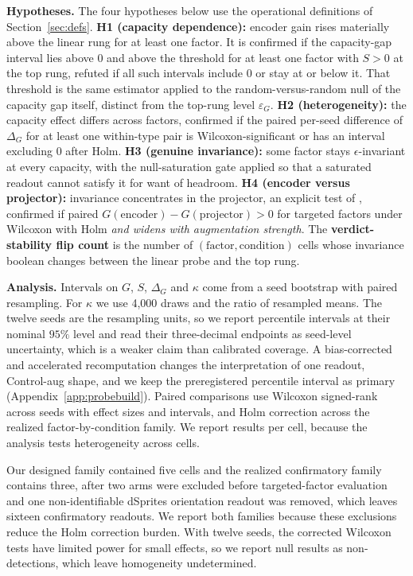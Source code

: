 \documentclass[10pt]{article}
\newcommand{\Sel}{S}
\newcommand{\G}{G}
\newcommand{\epsG}{\varepsilon_G}
\begin{document}
\textbf{Hypotheses.} The four hypotheses below use the operational definitions of
Section~\ref{sec:defs}. \textbf{H1 (capacity dependence):} encoder
gain rises materially above the linear rung for at least one factor. It is confirmed if the
capacity-gap interval lies above $0$ and above the threshold for at least one factor with $\Sel>0$
at the top rung, refuted if all such intervals include $0$ or stay at or below it. That threshold is
the same estimator applied to the random-versus-random null of the capacity gap itself, distinct from the top-rung level $\epsG$. \textbf{H2 (heterogeneity):} the capacity effect differs across factors,
confirmed if the paired per-seed difference of $\Delta_{\G}$ for at least one within-type pair is
Wilcoxon-significant or has an interval excluding $0$ after Holm. \textbf{H3 (genuine invariance):}
some factor stays $\epsilon$-invariant at every capacity, with the null-saturation gate applied so
that a saturated readout cannot satisfy it for want of headroom. \textbf{H4 (encoder versus
projector):} invariance concentrates in the projector, an explicit test of
\citet{cosentino2022geometry}, confirmed if paired $\G(\text{encoder}) - \G(\text{projector}) > 0$
for targeted factors under Wilcoxon with Holm \emph{and widens with augmentation strength}. The
\textbf{verdict-stability flip count} is the number of $(\text{factor}, \text{condition})$ cells
whose invariance boolean changes between the linear probe and the top rung.

\textbf{Analysis.} Intervals on $\G$, $\Sel$, $\Delta_{\G}$ and $\kappa$ come from a seed bootstrap
with paired resampling. For $\kappa$ we use 4{,}000 draws and the ratio of resampled means. The
twelve seeds are the resampling units, so we report percentile intervals at their nominal $95\%$
level and read their three-decimal endpoints as seed-level uncertainty, which is a weaker claim than
calibrated coverage. A
bias-corrected and accelerated recomputation changes the interpretation of one readout, Control-aug
shape, and we keep the preregistered percentile interval as primary
(Appendix~\ref{app:probebuild}). Paired comparisons use Wilcoxon signed-rank across seeds with
effect sizes and intervals, and Holm correction across the realized factor-by-condition family. We report results per cell, because the analysis tests heterogeneity across cells.

Our designed family contained five cells and the realized confirmatory family contains three, after
two arms were excluded before targeted-factor evaluation and one non-identifiable dSprites
orientation readout was removed, which leaves sixteen confirmatory readouts. We report both
families because these exclusions reduce the Holm correction
burden. With twelve seeds, the corrected Wilcoxon tests have limited power for small effects, so
we report null results as non-detections, which leave homogeneity undetermined.
\end{document}
